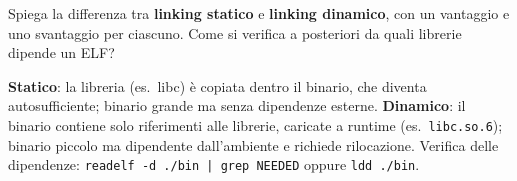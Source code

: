 \question[4]
Spiega la differenza tra \textbf{linking statico} e \textbf{linking dinamico}, con un vantaggio e uno svantaggio per ciascuno.
Come si verifica a posteriori da quali librerie dipende un ELF?
\begin{solution}
\textbf{Statico}: la libreria (es.\ libc) è copiata dentro il binario, che diventa autosufficiente; binario grande ma senza dipendenze esterne.
\textbf{Dinamico}: il binario contiene solo riferimenti alle librerie, caricate a runtime (es.\ \lstinline|libc.so.6|); binario piccolo ma dipendente dall'ambiente e richiede rilocazione.
Verifica delle dipendenze: \lstinline!readelf -d ./bin | grep NEEDED! oppure \lstinline|ldd ./bin|.
\end{solution}
